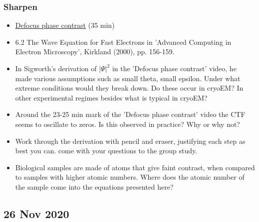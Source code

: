 \documentclass[11pt, oneside]{article}   	%
\begin{document}
\subsubsection{Sharpen}
\begin{itemize}
	\item \href{https://yale.app.box.com/s/2nciyzqd576e61kpopi7zdd08gsl35zz}{Defocus phase contrast} (35 min)
	\item 6.2 The Wave Equation for Fast Electrons in 'Advanced Computing in Electron Microscopy', Kirkland (2000), pp. 156-159.
\end{itemize}
\begin{itemize}
\item In Sigworth's derivation of $|\Psi|^2$ in the 'Defocus phase contrast' video, he made various assumptions such as small theta, small epsilon. Under what extreme conditions would they break down. Do these occur in cryoEM? In other experimental regimes besides what is typical in cryoEM?
\item Around the 23-25 min mark of the 'Defocus phase contrast' video the CTF seems to oscillate to zeros. Is this observed in practice? Why or why not?
\item Work through the derivation with pencil and eraser, justifying each step as best you can. come with your questions to the group study.
\item Biological samples are made of atoms that give faint contrast, when compared to samples with higher atomic numbers. Where does the atomic number of the sample come into the equations presented here? 
\end{itemize}

\pagebreak
\subsection{26 Nov 2020}
\end{document}
